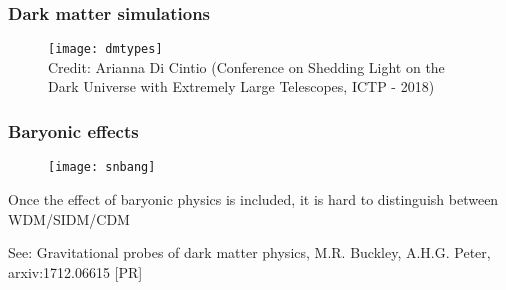 \begin{frame}
  \frametitle{Dark matter simulations}
  \begin{figure}
    \centering
    \texttt{[image: dmtypes]}\\
    {\tiny Credit: Arianna Di Cintio (Conference on Shedding Light on the Dark Universe with Extremely Large Telescopes, ICTP - 2018)}
  \end{figure}
\end{frame}


\begin{frame}
  \frametitle{Baryonic effects}
  \begin{figure}
    \centering
    \texttt{[image: snbang]}
  \end{figure}
  Once the effect of baryonic physics is included, it is
  hard to distinguish between WDM/SIDM/CDM

  \begin{center}
    	
\footnotesize See: Gravitational probes of dark matter physics, M.R. Buckley, A.H.G. Peter, arxiv:1712.06615 [PR]
  \end{center}
\end{frame}


